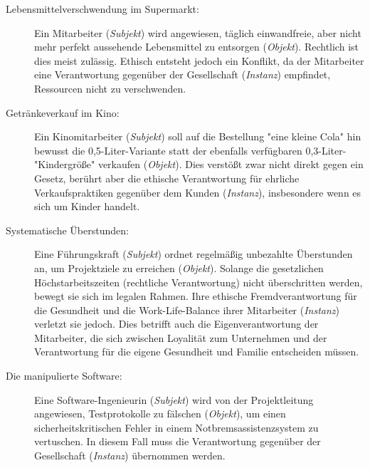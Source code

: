 \documentclass[
    12pt,               %
    a4paper,            %
    ngerman             %
]{scrartcl}
\begin{document}
\begin{description}
    \item[Lebensmittelverschwendung im Supermarkt:] Ein Mitarbeiter (\textit{Subjekt}) wird angewiesen, täglich einwandfreie, aber nicht mehr perfekt aussehende Lebensmittel zu entsorgen (\textit{Objekt}). Rechtlich ist dies meist zulässig. Ethisch entsteht jedoch ein Konflikt, da der Mitarbeiter eine Verantwortung gegenüber der Gesellschaft (\textit{Instanz}) empfindet, Ressourcen nicht zu verschwenden.
    \item[Getränkeverkauf im Kino:] Ein Kinomitarbeiter (\textit{Subjekt}) soll auf die Bestellung "eine kleine Cola" hin bewusst die 0,5-Liter-Variante statt der ebenfalls verfügbaren 0,3-Liter-"Kindergröße" verkaufen (\textit{Objekt}). Dies verstößt zwar nicht direkt gegen ein Gesetz, berührt aber die ethische Verantwortung für ehrliche Verkaufspraktiken gegenüber dem Kunden (\textit{Instanz}), insbesondere wenn es sich um Kinder handelt.
    \item[Systematische Überstunden:] Eine Führungskraft (\textit{Subjekt}) ordnet regelmäßig unbezahlte Überstunden an, um Projektziele zu erreichen (\textit{Objekt}). Solange die gesetzlichen Höchstarbeitszeiten (rechtliche Verantwortung) nicht überschritten werden, bewegt sie sich im legalen Rahmen. Ihre ethische Fremdverantwortung für die Gesundheit und die Work-Life-Balance ihrer Mitarbeiter (\textit{Instanz}) verletzt sie jedoch. Dies betrifft auch die Eigenverantwortung der Mitarbeiter, die sich zwischen Loyalität zum Unternehmen und der Verantwortung für die eigene Gesundheit und Familie entscheiden müssen.
    \item[Die manipulierte Software:] Eine Software-Ingenieurin (\textit{Subjekt}) wird von der Projektleitung angewiesen, Testprotokolle zu fälschen (\textit{Objekt}), um einen sicherheitskritischen Fehler in einem Notbremsassistenzsystem zu vertuschen. In diesem Fall muss die Verantwortung gegenüber der Gesellschaft (\textit{Instanz}) übernommen werden.
\end{description}


\end{document}
